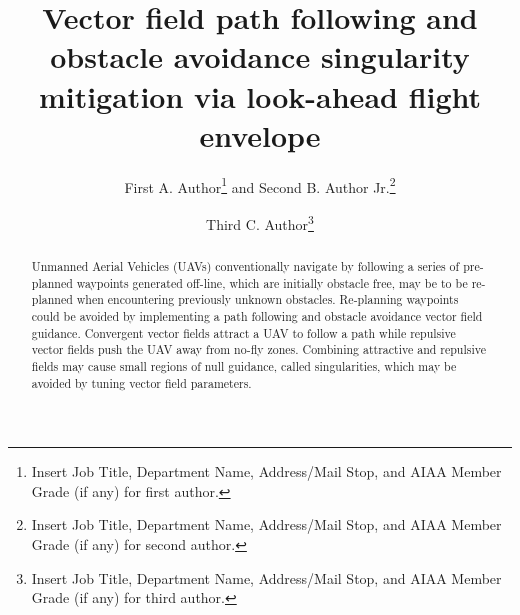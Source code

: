 \documentclass[conf]{new-aiaa}
\title{Vector field  path following and obstacle avoidance singularity mitigation via look-ahead flight envelope}
\author{First A. Author\footnote{Insert Job Title, Department Name, Address/Mail Stop, and AIAA Member Grade (if any) for first author.} and Second B. Author Jr.\footnote{Insert Job Title, Department Name, Address/Mail Stop, and AIAA Member Grade (if any) for second author.}}
\affil{Business or Academic Affiliation 1, City, State, Zip Code}
\author{Third C. Author\footnote{Insert Job Title, Department Name, Address/Mail Stop, and AIAA Member Grade (if any) for third author.}}
\begin{document}
\maketitle

\begin{abstract}
Unmanned Aerial Vehicles (UAVs) conventionally navigate by following a series of pre-planned waypoints generated off-line, which are initially obstacle free, may be to be re-planned when encountering previously unknown obstacles. Re-planning waypoints could be avoided by implementing a path following and obstacle avoidance vector field guidance. Convergent vector fields attract a UAV to follow a path while repulsive vector fields push the UAV away from no-fly zones. Combining attractive and repulsive fields may cause small regions of null guidance, called singularities, which may be avoided by tuning vector field parameters. 
\end{abstract}





 
\end{document}
